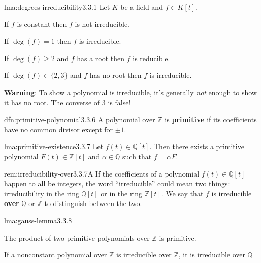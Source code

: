 \documentclass[landscape, 8pt]{extarticle}
\begin{document}
\begin{multicols}{3}
\begin{lma}{lma:degrees-irreducibility}{3.3.1}
    Let $K$ be a field and $f \in K[t]$.
    \begin{enumerate-tight}
        \item If $f$ is constant then $f$ is not irreducible.
        \item If $\deg(f) = 1$ then $f$ is irreducible.
        \item If $\deg(f) \ge 2$ and $f$ has a root then $f$ is reducible.
        \item If $\deg(f)\in \{2,3\}$ and $f$ has no root then $f$ is irreducible.
    \end{enumerate-tight}

    \textbf{Warning}: To show a polynomial is irreducible, it's generally \textit{not} enough to show it has no root. The converse of $3$ is false!
\end{lma}

\begin{dfn}{dfn:primitive-polynomial}{3.3.6}
    A polynomial over $\mathbb{Z}$ is \textbf{primitive} if its coefficients have no common divisor except for $\pm 1$.
\end{dfn}

\newpage

\begin{lma}{lma:primitive-existence}{3.3.7}
    Let $f(t)\in \mathbb{Q}[t]$. Then there exists a primitive polynomial $F(t)\in \mathbb{Z}[t]$ and $\alpha\in \mathbb{Q}$ such that $f = \alpha F$.
\end{lma}


\begin{rem}{rem:irreducibility-over}{3.3.7A}
    If the coefficients of a polynomial $f(t)\in \mathbb{Q}[t]$ happen to all be integers, the word ``irreducible'' could mean two things: irreducibility in the ring $\mathbb{Q}[t]$ or in the ring $\mathbb{Z}[t]$. We say that $f$ is irreducible \textbf{over} $\mathbb{Q}$ or $\mathbb{Z}$ to distinguish between the two.
\end{rem}

\begin{lma}{lma:gauss-lemma}{3.3.8}
    \begin{enumerate-tight}
        \item The product of two primitive polynomials over $\mathbb{Z}$ is primitive.
        \item If a nonconstant polynomial over $\mathbb{Z}$ is irreducible over $\mathbb{Z}$, it is irreducible over $\mathbb{Q}$
    \end{enumerate-tight}
\end{lma}


\end{multicols}
\end{document}
